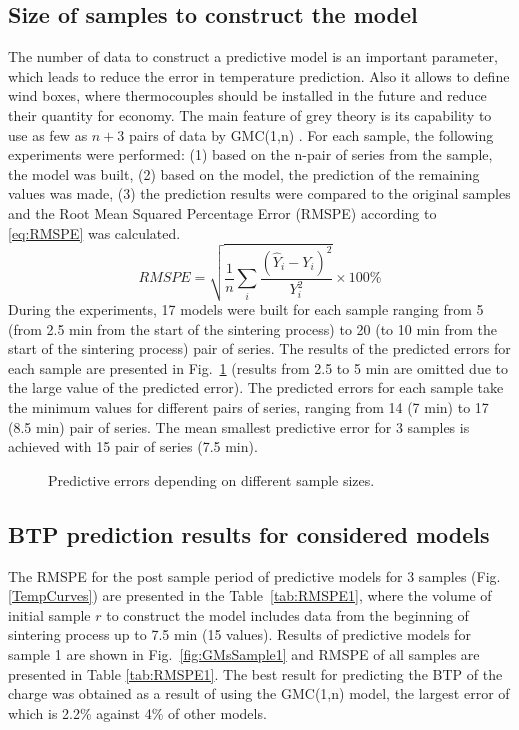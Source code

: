 \documentclass[AMS,STIX2COL]{WileyNJD-v2}
\begin{document}
\subsection{Size of samples to construct the model}
The number of data to construct a predictive model is an important parameter, which leads to reduce the error in temperature prediction. Also it allows to define wind boxes, where thermocouples should be installed in the future and reduce their quantity for economy. The main feature of grey theory is its capability to use as few as $n+3$ pairs of data by GMC(1,n) \cite{Tien2005}. For each sample, the following experiments were performed: (1) based on the n-pair of series from the sample, the model was built, (2)	based on the model, the prediction of the remaining values was made, (3) the prediction results were compared to the original samples and the Root Mean Squared Percentage Error (RMSPE) according to \eqref{eq:RMSPE} was calculated.
\begin{equation} \label{eq:RMSPE}
RMSPE = \sqrt{\frac{1}{n}\sum_{i}\frac{\left(\hat{Y}_i-Y_i\right)^2}{Y_i^2}}\times 100\%
\end{equation}
During the experiments, 17 models were built for each sample ranging from 5 (from 2.5 min from the start of the sintering process) to 20 (to 10 min from the start of the sintering process) pair of series. The results of the predicted errors for each sample are presented in Fig.~\ref{fig:RMSPE} (results from 2.5 to 5 min are omitted due to the large value of the predicted error).
The predicted errors for each sample take the minimum values for different pairs of series, ranging from 14 (7 min) to 17 (8.5 min) pair of series. The mean smallest predictive error for 3 samples is achieved with 15 pair of series (7.5 min).

\begin{figure}[htbp]
	\centering
	\caption{Predictive errors depending on different sample sizes.} \label{fig:RMSPE}
\end{figure} 

\subsection{BTP prediction results for considered models}
The RMSPE for the post sample period of predictive models for 3 samples (Fig. \ref{TempCurves}) are presented in the Table~\ref{tab:RMSPE1}, where the volume of initial sample $r$  to construct the model includes data from the beginning of sintering process up to 7.5 min (15 values). Results of predictive models for sample 1 are shown in Fig.~\ref{fig:GMsSample1} and RMSPE of all samples are presented in Table \ref{tab:RMSPE1}. The best result for predicting the BTP of the charge was obtained as a result of using the GMC(1,n) model, the largest error of which is 2.2\% against 4\% of other models.  
\end{document}
